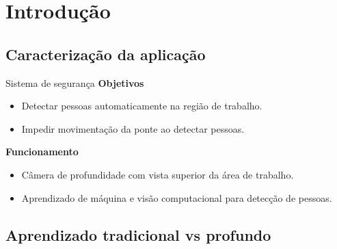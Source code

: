 \section{Introdução}

\subsection{Caracterização da aplicação}
	\begin{frame}{\insertsubsection}
	\end{frame}

	\begin{frame}{\insertsubsection}
	\end{frame}

	\begin{frame}{\insertsubsection}
	\end{frame}

	\begin{frame}{Sistema de segurança}
		\textbf{Objetivos} \\
		\begin{itemize}
			\item Detectar pessoas automaticamente na região de trabalho.
			\item Impedir movimentação da ponte ao detectar pessoas.
		\end{itemize}

		\pause

		\textbf{Funcionamento} \\
		\begin{itemize}
			\item Câmera de profundidade com vista superior da área de trabalho.
			\item Aprendizado de máquina e visão computacional para detecção de pessoas.
		\end{itemize}
	\end{frame}

\subsection{Aprendizado tradicional vs profundo}

